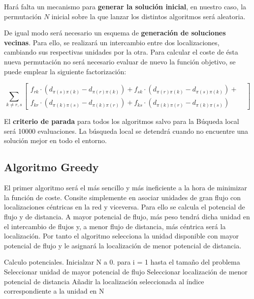\documentclass[10pt,a4paper]{article}
\begin{document}
Hará falta un mecanismo para \textbf{generar la solución inicial}, en nuestro caso, la permutación $N$ inicial sobre la que lanzar los distintos algoritmos será aleatoria.

De igual modo será necesario un esquema de \textbf{generación de soluciones vecinas}. Para ello, se realizará un intercambio entre dos localizaciones, cambiando sus respectivas unidades por la otra. Para calcular el coste de ésta nueva permutación no será necesario evaluar de nuevo la función objetivo, se puede emplear la siguiente factorización:

\begin{displaymath}
    \sum_{k \neq r,s}
\begin{bmatrix}
 f_{rk}\cdot (d_{\pi (s)\pi(k)} -  d_{\pi (r)\pi(k)})
+ f_{sk}\cdot (d_{\pi (r)\pi(k)} -  d_{\pi (s)\pi(k)}) +  & \\
f_{kr}\cdot (d_{\pi (k)\pi(s)} -  d_{\pi (k)\pi(r)})  +
f_{ks}\cdot (d_{\pi (k)\pi(r)} -  d_{\pi (k)\pi(s)})  &
\end{bmatrix}
\end{displaymath}

El \textbf{criterio de parada} para todos los algoritmos salvo para la Búqueda local será 10000 evaluaciones. La búsqueda local se detendrá cuando no encuentre una solución mejor en todo el entorno.

\subsection{Algoritmo Greedy}

El primer algoritmo será el más sencillo y más ineficiente a la hora de minimizar la función de coste. Consite simplemente en asociar unidades de gran flujo con localizaciones céntricas en la red y viceversa. Para ello se calcula el potencial de flujo y de distancia. A mayor potencial de flujo, más peso tendrá dicha unidad en el intercambio de flujos y, a menor flujo de distancia, más céntrica será la localización. Por tanto el algoritmo selecciona la unidad disponible con mayor potencial de flujo y le asignará la localización de menor potencial de distancia.

\begin{ccode}
    Calculo potenciales.
    Inicialzar N a 0.
    para i = 1 hasta el tamaño del problema
        Seleccionar unidad de mayor potencial de flujo
        Seleccionar localización de menor potencial de distancia
        Añadir la localización seleccionada al índice correspondiente a la unidad en N
\end{ccode}
\end{document}
